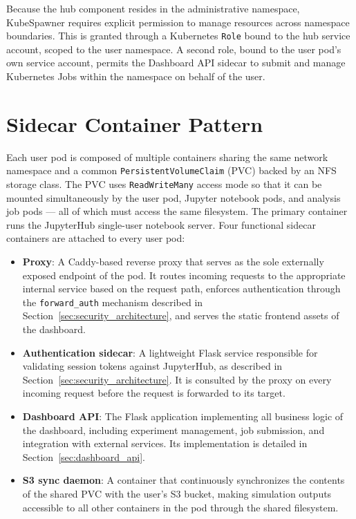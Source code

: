 \documentclass[
  digital,     %
  color,       %
  oneside,     %
  nosansbold,  %
  nocolorbold, %
  lof,         %
  lot,         %
]{fithesis4}
\begin{document}
Because the hub component resides in the administrative namespace, KubeSpawner requires explicit permission to manage resources across namespace boundaries. This is granted through a Kubernetes \texttt{Role} bound to the hub service account, scoped to the user namespace. A second role, bound to the user pod's own service account, permits the Dashboard API sidecar to submit and manage Kubernetes Jobs within the namespace on behalf of the user.

\section{Sidecar Container Pattern}
\label{sec:sidecar_pattern}

Each user pod is composed of multiple containers sharing the same network namespace and a common \texttt{PersistentVolumeClaim} (PVC) backed by an NFS storage class. The PVC uses \texttt{ReadWriteMany} access mode so that it can be mounted simultaneously by the user pod, Jupyter notebook pods, and analysis job pods --- all of which must access the same filesystem. The primary container runs the JupyterHub single-user notebook server. Four functional sidecar containers are attached to every user pod:

\begin{itemize}
    \item \textbf{Proxy}: A Caddy-based reverse proxy that serves as the sole externally exposed endpoint of the pod. It routes incoming requests to the appropriate internal service based on the request path, enforces authentication through the \texttt{forward\_auth} mechanism described in Section~\ref{sec:security_architecture}, and serves the static frontend assets of the dashboard.
    \item \textbf{Authentication sidecar}: A lightweight Flask service responsible for validating session tokens against JupyterHub, as described in Section~\ref{sec:security_architecture}. It is consulted by the proxy on every incoming request before the request is forwarded to its target.
    \item \textbf{Dashboard API}: The Flask application implementing all business logic of the dashboard, including experiment management, job submission, and integration with external services. Its implementation is detailed in Section~\ref{sec:dashboard_api}.
    \item \textbf{S3 sync daemon}: A container that continuously synchronizes the contents of the shared PVC with the user's S3 bucket, making simulation outputs accessible to all other containers in the pod through the shared filesystem.
\end{itemize}
\end{document}
